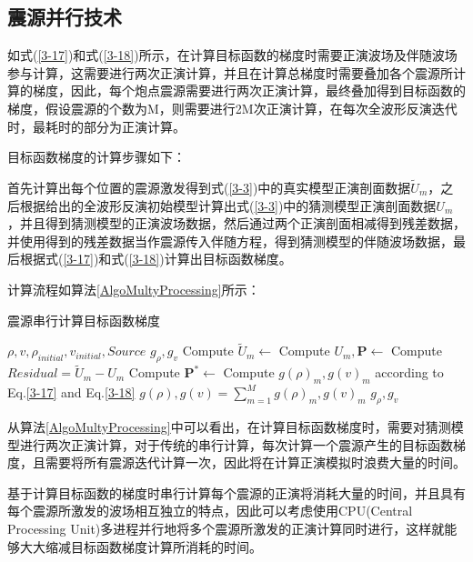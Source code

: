 \documentclass[12pt]{article}
\renewcommand{\algorithmicrequire}{\textbf{参数说明:}}
\renewcommand{\algorithmicensure}{\textbf{输出:}}
\begin{document}
\subsection{震源并行技术}
如式(\ref{3-17})和式(\ref{3-18})所示，在计算目标函数的梯度时需要正演波场及伴随波场参与计算，这需要进行两次正演计算，并且在计算总梯度时需要叠加各个震源所计算的梯度，因此，每个炮点震源需要进行两次正演计算，最终叠加得到目标函数的梯度，假设震源的个数为M，则需要进行2M次正演计算，在每次全波形反演迭代时，最耗时的部分为正演计算。
\par
目标函数梯度的计算步骤如下：
\par
首先计算出每个位置的震源激发得到式(\ref{3-3})中的真实模型正演剖面数据$\tilde{U}_m$，之后根据给出的全波形反演初始模型计算出式(\ref{3-3})中的猜测模型正演剖面数据$U_m$，并且得到猜测模型的正演波场数据，然后通过两个正演剖面相减得到残差数据，并使用得到的残差数据当作震源传入伴随方程，得到猜测模型的伴随波场数据，最后根据式(\ref{3-17})和式(\ref{3-18})计算出目标函数梯度。
\par
计算流程如算法\ref{AlgoMultyProcessing}所示：
\begin{algorithm}[H]
\caption{震源串行计算目标函数梯度}
\label{AlgoMultyProcessing}
\renewcommand{\algorithmicrequire}{\textbf{输入:}}
\renewcommand{\algorithmicensure}{\textbf{输出:}}
\begin{algorithmic}[1]
\Require
$\rho,v,\rho_{initial},v_{initial},Source$
\Ensure
$g_{\rho},g_{v}$
\State Compute $\tilde{U}_m \gets$
\State Compute $U_m,\boldsymbol{P} \gets$
\State Compute $Residual=\tilde{U}_m-U_m$
\State Compute $\boldsymbol{P^*} \gets$
\State Compute $g(\rho)_m,g(v)_m$ according to Eq.\ref{3-17} and Eq.\ref{3-18} 
\EndFor
\State $g(\rho),g(v)=\sum_{m=1}^{M}g(\rho)_m,g(v)_m$ 
\State \Return $g_{\rho},g_{v}$
\end{algorithmic}
\end{algorithm}
\par
从算法\ref{AlgoMultyProcessing}中可以看出，在计算目标函数梯度时，需要对猜测模型进行两次正演计算，对于传统的串行计算，每次计算一个震源产生的目标函数梯度，且需要将所有震源迭代计算一次，因此将在计算正演模拟时浪费大量的时间。
\par
基于计算目标函数的梯度时串行计算每个震源的正演将消耗大量的时间，并且具有每个震源所激发的波场相互独立的特点，因此可以考虑使用CPU(Central Processing Unit)多进程并行地将多个震源所激发的正演计算同时进行，这样就能够大大缩减目标函数梯度计算所消耗的时间。
\end{document}

